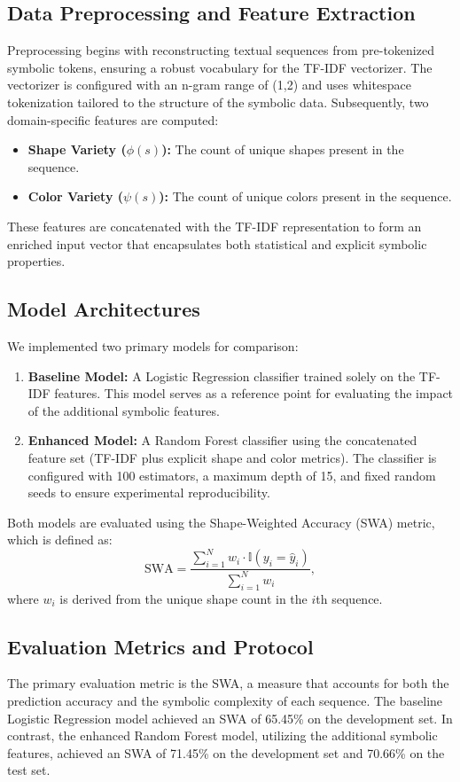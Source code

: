 \documentclass{article}
\begin{document}
\subsection{Data Preprocessing and Feature Extraction}
Preprocessing begins with reconstructing textual sequences from pre-tokenized symbolic tokens, ensuring a robust vocabulary for the TF-IDF vectorizer. The vectorizer is configured with an n-gram range of (1,2) and uses whitespace tokenization tailored to the structure of the symbolic data. Subsequently, two domain-specific features are computed:
\begin{itemize}
    \item \textbf{Shape Variety (\(\phi(s)\)):} The count of unique shapes present in the sequence.
    \item \textbf{Color Variety (\(\psi(s)\)):} The count of unique colors present in the sequence.
\end{itemize}
These features are concatenated with the TF-IDF representation to form an enriched input vector that encapsulates both statistical and explicit symbolic properties.

\subsection{Model Architectures}
We implemented two primary models for comparison:
\begin{enumerate}
    \item \textbf{Baseline Model:} A Logistic Regression classifier trained solely on the TF-IDF features. This model serves as a reference point for evaluating the impact of the additional symbolic features.
    \item \textbf{Enhanced Model:} A Random Forest classifier using the concatenated feature set (TF-IDF plus explicit shape and color metrics). The classifier is configured with 100 estimators, a maximum depth of 15, and fixed random seeds to ensure experimental reproducibility.
\end{enumerate}
Both models are evaluated using the Shape-Weighted Accuracy (SWA) metric, which is defined as:
\[
\mathrm{SWA} = \frac{\sum_{i=1}^{N} w_i \cdot \mathbb{I}(y_i = \hat{y}_i)}{\sum_{i=1}^{N} w_i},
\]
where \(w_i\) is derived from the unique shape count in the \(i\)th sequence.

\subsection{Evaluation Metrics and Protocol}
The primary evaluation metric is the SWA, a measure that accounts for both the prediction accuracy and the symbolic complexity of each sequence. The baseline Logistic Regression model achieved an SWA of 65.45\% on the development set. In contrast, the enhanced Random Forest model, utilizing the additional symbolic features, achieved an SWA of 71.45\% on the development set and 70.66\% on the test set. 
\end{document}
